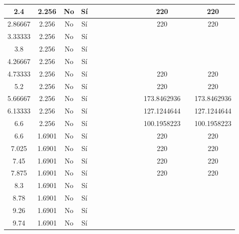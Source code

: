 \begin{table}[H]
{\begin{tabular}{|c|c|c|c|c|c|c|c|c|c|c|c|c|c|}
\hline
2.4 & 2.256 & No  & Sí  &     &     &     &     &     &     &     & 220 &     & 220 \bigstrut\\
\hline
2.86667 & 2.256 & No  & Sí  &     &     &     &     &     &     &     & 220 &     & 220 \bigstrut\\
\hline
3.33333 & 2.256 & No  & Sí  &     &     &     &     &     &     &     &     &     &  \bigstrut\\
\hline
3.8 & 2.256 & No  & Sí  &     &     &     &     &     &     &     &     &     &  \bigstrut\\
\hline
4.26667 & 2.256 & No  & Sí  &     &     &     &     &     &     &     &     &     &  \bigstrut\\
\hline
4.73333 & 2.256 & No  & Sí  &     &     &     &     &     &     &     & 220 &     & 220 \bigstrut\\
\hline
5.2 & 2.256 & No  & Sí  &     &     &     &     &     &     &     & 220 &     & 220 \bigstrut\\
\hline
5.66667 & 2.256 & No  & Sí  &     &     &     &     &     &     &     & 173.8462936 &     & 173.8462936 \bigstrut\\
\hline
6.13333 & 2.256 & No  & Sí  &     &     &     &     &     &     &     & 127.1244644 &     & 127.1244644 \bigstrut\\
\hline
6.6 & 2.256 & No  & Sí  &     &     &     &     &     &     &     & 100.1958223 &     & 100.1958223 \bigstrut\\
\hline
6.6 & 1.6901 & No  & Sí  &     &     &     &     &     &     &     & 220 &     & 220 \bigstrut\\
\hline
7.025 & 1.6901 & No  & Sí  &     &     &     &     &     &     &     & 220 &     & 220 \bigstrut\\
\hline
7.45 & 1.6901 & No  & Sí  &     &     &     &     &     &     &     & 220 &     & 220 \bigstrut\\
\hline
7.875 & 1.6901 & No  & Sí  &     &     &     &     &     &     &     & 220 &     & 220 \bigstrut\\
\hline
8.3 & 1.6901 & No  & Sí  &     &     &     &     &     &     &     &     &     &  \bigstrut\\
\hline
8.78 & 1.6901 & No  & Sí  &     &     &     &     &     &     &     &     &     &  \bigstrut\\
\hline
9.26 & 1.6901 & No  & Sí  &     &     &     &     &     &     &     &     &     &  \bigstrut\\
\hline
9.74 & 1.6901 & No  & Sí  &     &     &     &     &     &     &     &     &     &  \bigstrut\\

\end{tabular}}
\end{table}
